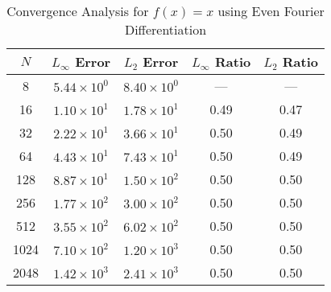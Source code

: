 \begin{table}[H]
\centering
\begin{tabular}{|c|c|c|c|c|}
\hline
$N$ & $L_\infty$ Error & $L_2$ Error & $L_\infty$ Ratio & $L_2$ Ratio \\
\hline
8 & $5.44 \times 10^{0}$ & $8.40 \times 10^{0}$ & --- & --- \\
16 & $1.10 \times 10^{1}$ & $1.78 \times 10^{1}$ & 0.49 & 0.47 \\
32 & $2.22 \times 10^{1}$ & $3.66 \times 10^{1}$ & 0.50 & 0.49 \\
64 & $4.43 \times 10^{1}$ & $7.43 \times 10^{1}$ & 0.50 & 0.49 \\
128 & $8.87 \times 10^{1}$ & $1.50 \times 10^{2}$ & 0.50 & 0.50 \\
256 & $1.77 \times 10^{2}$ & $3.00 \times 10^{2}$ & 0.50 & 0.50 \\
512 & $3.55 \times 10^{2}$ & $6.02 \times 10^{2}$ & 0.50 & 0.50 \\
1024 & $7.10 \times 10^{2}$ & $1.20 \times 10^{3}$ & 0.50 & 0.50 \\
2048 & $1.42 \times 10^{3}$ & $2.41 \times 10^{3}$ & 0.50 & 0.50 \\
\hline
\end{tabular}
\caption{Convergence Analysis for $f(x) = x$ using Even Fourier Differentiation}
\label{tab:linearx}
\end{table}
